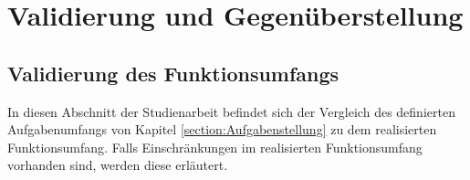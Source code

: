 
\chapter{Validierung und Gegenüberstellung}


\section{Validierung des Funktionsumfangs}

In diesen Abschnitt der Studienarbeit befindet sich der Vergleich des definierten Aufgabenumfangs von Kapitel \ref{section:Aufgabenstellung} zu dem realisierten Funktionsumfang. Falls Einschränkungen im realisierten Funktionsumfang vorhanden sind, werden diese erläutert.

